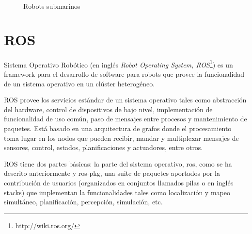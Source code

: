 \begin{figure}[hbtp]
  \begin{center}
  \end{center}
  \caption{Robots submarinos}
  \label{fig:submarino}
\end{figure}
  
\section{ROS}
\label{cap:ROS}

Sistema Operativo Robótico (en inglés \textit{Robot Operating System, ROS}\footnote{http://wiki.ros.org/}) es un framework para el desarrollo de software para robots que provee la funcionalidad de un sistema operativo en un clúster heterogéneo. 

ROS provee los servicios estándar de un sistema operativo tales como abstracción del hardware, control de dispositivos de bajo nivel, implementación de funcionalidad de uso común, paso de mensajes entre procesos y mantenimiento de paquetes. Está basado en una arquitectura de grafos donde el procesamiento toma lugar en los nodos que pueden recibir, mandar y multiplexar mensajes de sensores, control, estados, planificaciones y actuadores, entre otros.

ROS tiene dos partes básicas: la parte del sistema operativo, ros, como se ha descrito anteriormente y ros-pkg, una suite de paquetes aportados por la contribución de usuarios (organizados en conjuntos llamados pilas o en inglés stacks) que implementan la funcionalidades tales como localización y mapeo simultáneo, planificación, percepción, simulación, etc.

